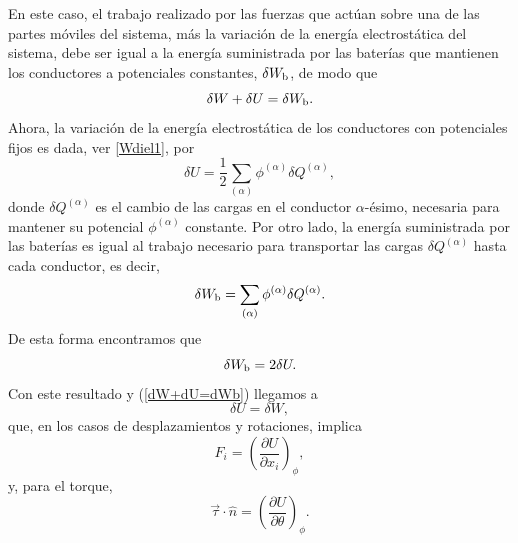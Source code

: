 En este caso, el trabajo realizado por las fuerzas que actúan sobre una de
las partes móviles del sistema, más la variación de la energía
electrostática del sistema, debe ser igual a la energía suministrada por las
baterías que mantienen los conductores a potenciales constantes, $\delta
W_{\rm b}$, de modo que
\begin{equation}
 \delta W + \delta U=\delta W_{\rm b}. \label{dW+dU=dWb}
\end{equation}
Ahora, la variación de la energía electrostática de los conductores con
potenciales fijos es dada, ver \eqref{Wdiel1}, por
\begin{equation}
 \delta U=\frac{1}{2}\sum_{(\alpha)}\phi^{(\alpha)}\delta Q^{(\alpha)},
\end{equation}
donde $\delta Q^{(\alpha)}$ es el cambio de las cargas en el conductor $\alpha$-ésimo,
necesaria para mantener su potencial $\phi^{(\alpha)}$ constante. Por otro lado, 
la energía suministrada por las baterías es igual al trabajo necesario para
transportar las cargas $\delta Q^{(\alpha)}$ hasta cada conductor, es decir,
\begin{equation}
 \delta W_{\rm b}=\sum_{(\alpha)}\phi^{(\alpha)}\delta Q^{(\alpha)}.
\end{equation}
De esta forma encontramos que
\begin{equation}
 \delta W_{\rm b}=2\delta U.
\end{equation}
Con este resultado y (\ref{dW+dU=dWb}) llegamos a
\begin{equation}
 \delta U=\delta W,
\end{equation}
que, en los casos de desplazamientos y rotaciones, implica
\begin{equation}
\boxed{F_i=\left(\frac{\partial U}{\partial x_i}\right)_\phi ,}
\end{equation}
y, para el torque,
\begin{equation}
 \boxed{\vec{\tau}\cdot\hat{n}=\left(\frac{\partial
U}{\partial\theta}\right)_\phi
.}
\end{equation}

